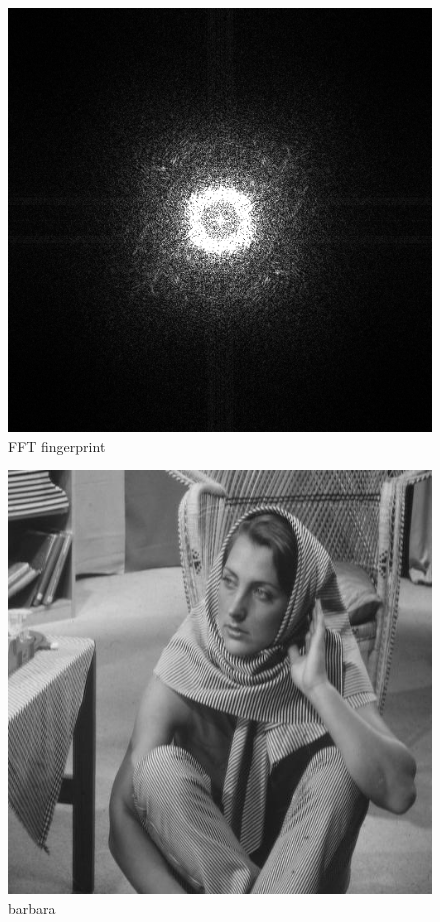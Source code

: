 \documentclass{article}
\begin{document}
\begin{figure}
	\begin{center}
		\includegraphics[scale=0.4]{fingerprint_FFT}\\
		FFT fingerprint
	\end{center}
\end{figure}
\begin{figure}
	\begin{center}
		\includegraphics[scale=0.4]{barbara_512}\\
		barbara
	\end{center}
\end{figure}
\end{document}
